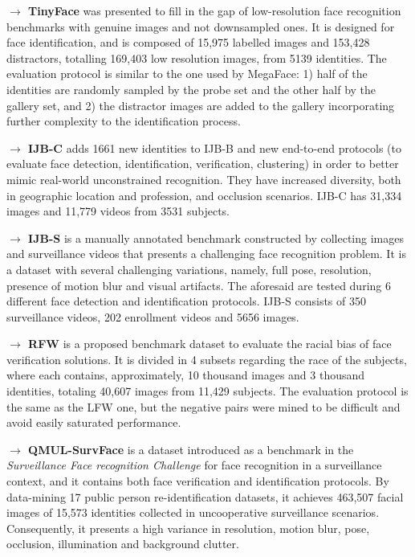 \documentclass[class=report, crop=false, a4paper, 12pt]{standalone}
\begin{document}
\vspace{0.7\baselineskip}
\noindent\textbf{$\rightarrow$ TinyFace} \autocite{chengLowResolutionFaceRecognition2019} was presented to fill in the gap of low-resolution face recognition benchmarks with genuine images and not downsampled ones. It is designed for face identification, and is composed of 15,975 labelled images and 153,428 distractors, totalling 169,403 low resolution images, from 5139 identities. The evaluation protocol is similar to the one used by MegaFace: 1) half of the identities are randomly sampled by the probe set and the other half by the gallery set, and 2) the distractor images are added to the gallery incorporating further complexity to the identification process.

\vspace{0.7\baselineskip}
\noindent\textbf{$\rightarrow$ IJB-C} \autocite{mazeIARPAJanusBenchmark2018} adds 1661 new identities to IJB-B and new end-to-end protocols (to evaluate face detection, identification, verification, clustering) in order to better mimic real-world unconstrained recognition. They have increased diversity, both in geographic location and profession, and occlusion scenarios. IJB-C has 31,334 images and 11,779 videos from 3531 subjects.

\vspace{0.7\baselineskip}
\noindent\textbf{$\rightarrow$ IJB-S} \autocite{kalkaIJBIARPAJanus2018} is a manually annotated benchmark constructed by collecting images and surveillance videos that presents a challenging face recognition problem. It is a dataset with several challenging variations, namely, full pose, resolution, presence of motion blur and visual artifacts. The aforesaid are tested during 6 different face detection and identification protocols. IJB-S consists of 350 surveillance videos, 202 enrollment videos and 5656 images. 

\vspace{0.7\baselineskip}
\noindent\textbf{$\rightarrow$ RFW} \autocite{wangRacialFacesWild2019} is a proposed benchmark dataset to evaluate the racial bias of face verification solutions. It is divided in 4 subsets regarding the race of the subjects, where each contains, approximately, 10 thousand images and 3 thousand identities, totaling 40,607 images from 11,429 subjects. The evaluation protocol is the same as the LFW one, but the negative pairs were mined to be difficult and avoid easily saturated performance.

\vspace{0.7\baselineskip}
\noindent\textbf{$\rightarrow$ QMUL-SurvFace} \autocite{chengSurveillanceFaceRecognition2018} is a dataset introduced as a benchmark in the \textit{Surveillance Face recognition Challenge} for face recognition in a surveillance context, and it contains both face verification and identification protocols. By data-mining 17 public person re-identification datasets, it achieves 463,507 facial images of 15,573 identities collected in uncooperative surveillance scenarios. Consequently, it presents a high variance in resolution, motion blur, pose, occlusion, illumination and background clutter.
\end{document}

